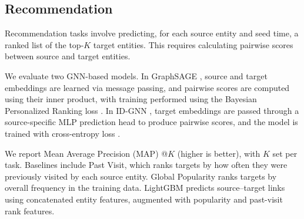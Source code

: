 \documentclass{article} %
\newcommand{\relbench}{\textsc{RelBench}\xspace}
\begin{document}
\begin{table}[t]
  \centering
  \caption{{\bf Entity regression results on \relbench.} Regression uses the $R^2$ metric (higher is better). Best values are in bold. See Table \ref{tab:entity_regression_r2_appendix} for standard deviations and Table \ref{tab:entity_regression_appendix} for MAE results.}
  \label{tab:entity_regression_main}
  \renewcommand{\arraystretch}{1.1}
  \scriptsize
  \vspace{-5pt}
    \begin{adjustbox}{max width=0.95\textwidth, center}
    
    \end{adjustbox}
  \vspace{-10pt}
\end{table}


\subsection{Recommendation}

Recommendation tasks involve predicting, for each source entity and seed time, a ranked list of the top-$K$ target entities. This requires calculating pairwise scores between source and target entities.

We evaluate two GNN-based models. In GraphSAGE \citep{hamilton2017inductive}, source and target embeddings are learned via message passing, and pairwise scores are computed using their inner product, with training performed using the Bayesian Personalized Ranking loss \citep{rendle2012bpr}. In ID-GNN \citep{you2021identity}, target embeddings are passed through a source-specific MLP prediction head to produce pairwise scores, and the model is trained with cross-entropy loss \citep{you2021identity}.

We report Mean Average Precision (MAP) @$K$ (higher is better), with $K$ set per task. Baselines include Past Visit, which ranks targets by how often they were previously visited by each source entity. Global Popularity ranks targets by overall frequency in the training data. LightGBM \citep{ke2017lightgbm} predicts source–target links using concatenated entity features, augmented with popularity and past-visit rank features.

\begin{table}[t]
  \centering
  \caption{{\bf Recommendation results on \relbench.} Recommendation uses the MAP metric, where higher values are better. Best values are in bold. See Table \ref{tab:recommendation_appendix} for standard deviations.}
  \label{tab:recommendation_main}
  \renewcommand{\arraystretch}{1.1}
  \scriptsize
  \vspace{-5pt}
    \resizebox{\textwidth}{!}{
    
    }
  \vspace{-10pt}
\end{table}
\end{document}
